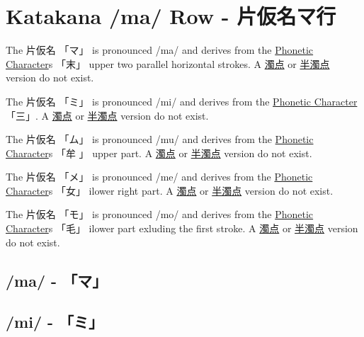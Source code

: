 \section{Katakana /ma/ Row - 片仮名マ行}\label{sec:KatakanaMaRow}


\label{letter:ma} The  片仮名 {「マ」} is pronounced  /ma/ and
derives from the \hyperref[sec:PhoneticCharacter]{Phonetic Character}s {「末」}
upper two parallel horizontal strokes.  A \hyperref[sec:Dakuten]{濁点} or
\hyperref[sec:Handakuten]{半濁点} version do not exist.

\label{letter:mi} The  片仮名 {「ミ」} is pronounced  /mi/ and
derives from the \hyperref[sec:PhoneticCharacter]{Phonetic Character} {「三」}.
A \hyperref[sec:Dakuten]{濁点} or \hyperref[sec:Handakuten]{半濁点} version do
not exist.

\label{letter:mu} The  片仮名 {「ム」} is pronounced  /mu/ and
derives from the \hyperref[sec:PhoneticCharacter]{Phonetic Character}s {「牟
」} upper part.  A \hyperref[sec:Dakuten]{濁点} or
\hyperref[sec:Handakuten]{半濁点} version do not exist.

\newpage

\label{letter:me} The  片仮名 {「メ」} is pronounced  /me/ and
derives from the \hyperref[sec:PhoneticCharacter]{Phonetic Character}s {「女」}
ilower right part.  A \hyperref[sec:Dakuten]{濁点} or
\hyperref[sec:Handakuten]{半濁点} version do not exist.



\label{letter:mo} The  片仮名 {「モ」} is pronounced  /mo/ and
derives from the \hyperref[sec:PhoneticCharacter]{Phonetic Character}s {「毛」}
ilower part exluding the first stroke.  A \hyperref[sec:Dakuten]{濁点} or
\hyperref[sec:Handakuten]{半濁点} version do not exist.

\newpage

\subsection{/ma/ - 「マ」} \label{sec:KatakanaMa}


\subsection{/mi/ - 「ミ」} \label{sec:KatakanaMi}

